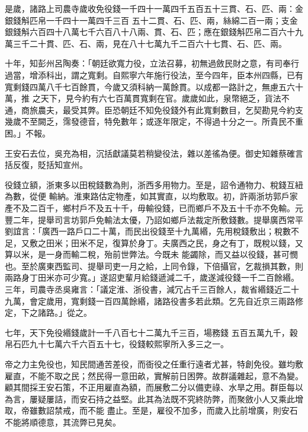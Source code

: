 \begin{pinyinscope}
 是歲，諸路上司農寺歲收免役錢一千四十一萬四千五百五十三貫、石、匹、兩：金銀錢斛匹帛一千四十一萬四千三百
 五十二貫、石、匹、兩，絲綿二百一兩；支金銀錢斛六百四十八萬七千六百八十八兩、貫、石、匹；應在銀錢斛匹帛二百六十九萬三千二十貫、匹、石、兩，見在八十七萬九千二百六十七貫、石、匹、兩。



 十年，知彭州呂陶奏：「朝廷欲寬力役，立法召募，初無過斂民財之意，有司奉行過當，增添科出，謂之寬剩。自熙寧六年施行役法，至今四年，臣本州四縣，已有寬剩錢四萬八千七百餘貫，今歲又須科納一萬餘貫。以成都一路計之，無慮五六十萬，推
 之天下，見今約有六七百萬貫寬剩在官。歲歲如此，泉幣絕乏，貨法不通，商旅農夫，最受其弊。臣恐朝廷不知免役錢外有此寬剩數目，乞契勘見今約支幾歲不至闕乏，霈發德音，特免數年；或逐年限定，不得過十分之一。所貴民不重困。」不報。



 王安石去位，吳充為相，沉括獻議莫若稍變役法，雜以差徭為便。御史知雜蔡確言括反復，貶括知宣州。



 役錢立額，浙東多以田稅錢數為則，浙西多用物力。至是，詔令通物力、稅錢互紐為數，從便
 輸納。淮東路估定物產，如其實直，以均敷取。初，許兩浙坊郭戶家產不及二百千，鄉村戶不及五十千，毋輸役錢，已而鄉戶不及五十千亦不免輸。元豐二年，提舉司言坊郭戶免輸法太優，乃詔如鄉戶法裁定所敷錢數。提舉廣西常平劉誼言：「廣西一路戶口二十萬，而民出役錢至十九萬緡，先用稅錢敷出；稅數不足，又敷之田米；田米不足，復算於身丁。夫廣西之民，身之有丁，既稅以錢，又算以米，是一身而輸二稅，殆前世弊法。今既未
 能蠲除，而又益以役錢，甚可憫也。至於廣東西監司、提舉司吏一月之給，上同令錄，下倍攝官，乞裁損其數，則兩路身丁田米亦可少寬。」遂詔吏輩月給錢遞減二千，歲遂減役錢一千二百餘緡。三年，司農寺丞吳雍言：「議定淮、浙役書，減冗占千三百餘人，裁省緡錢近二十九萬，會定歲用，寬剩錢一百四萬餘緡，諸路役書多若此類。乞先自近京三兩路修定，下之諸路。」從之。



 七年，天下免役緡錢歲計一千八百七十二萬九千三百，場務錢
 五百五萬九千，穀帛石匹九十七萬六千六百五十七，役錢較熙寧所入多三之一。



 帝之力主免役也，知民間通苦差役，而衙役之任重行遠者尤甚，特創免役。雖均敷雇直，不能不取之民；然民得一意田畝，實解前日困弊。故群議雜起，意不為變。顧其間採王安石策，不正用雇直為額，而展敷二分以備吏祿、水旱之用。群臣每以為言，屢疑屢詰，而安石持之益堅。此其為法既不究終防弊，而聚斂小人又乘此增取，帝雖數詔禁戒，而不能
 盡止。至是，雇役不加多，而歲入比前增廣，則安石不能將順德意，其流弊已見矣。




\end{pinyinscope}
